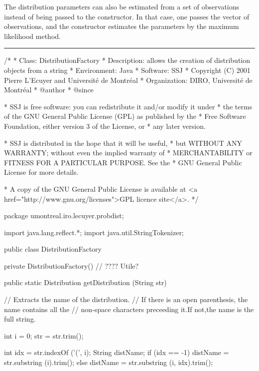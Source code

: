 The distribution parameters can also be estimated from a set of observations
instead of being passed to the constructor.  In that case, one passes the
vector of observations, and the constructor estimates the parameters by
the maximum likelihood method.


\bigskip\hrule

\begin{code}
\begin{hide}
/*
 * Class:        DistributionFactory
 * Description:  allows the creation of distribution objects from a string
 * Environment:  Java
 * Software:     SSJ 
 * Copyright (C) 2001  Pierre L'Ecuyer and Université de Montréal
 * Organization: DIRO, Université de Montréal
 * @author       
 * @since

 * SSJ is free software: you can redistribute it and/or modify it under
 * the terms of the GNU General Public License (GPL) as published by the
 * Free Software Foundation, either version 3 of the License, or
 * any later version.

 * SSJ is distributed in the hope that it will be useful,
 * but WITHOUT ANY WARRANTY; without even the implied warranty of
 * MERCHANTABILITY or FITNESS FOR A PARTICULAR PURPOSE.  See the
 * GNU General Public License for more details.

 * A copy of the GNU General Public License is available at
   <a href="http://www.gnu.org/licenses">GPL licence site</a>.
 */
\end{hide}
package umontreal.iro.lecuyer.probdist;
\begin{hide}
import java.lang.reflect.*;
import java.util.StringTokenizer;\end{hide}

public class DistributionFactory\begin{hide} {
   private DistributionFactory() {}   //  ????   Utile?

   public static Distribution getDistribution (String str) {
      // Extracts the name of the distribution.
      // If there is an open parenthesis, the name contains all the 
      // non-space characters preceeding it.If not,the name is the full string.

      int i = 0;
      str = str.trim();

      int idx = str.indexOf ('(', i);
      String distName;
      if (idx == -1)
         distName = str.substring (i).trim();
      else
         distName = str.substring (i, idx).trim();
 
}}
\end{hide}
\end{code}
